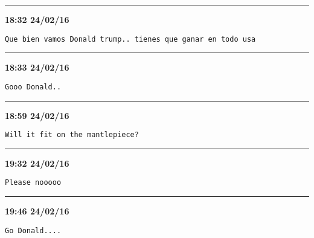 \hrule%

\begin{adjustwidth}{0cm}{0cm}
\footnotesize \textbf{18:32 24/02/16}

\begin{lstlisting}[breaklines, breakatwhitespace, basicstyle=\small, frame=leftline]
Que bien vamos Donald trump.. tienes que ganar en todo usa
\end{lstlisting}
\end{adjustwidth}

\hrule%

\begin{adjustwidth}{0cm}{0cm}
\footnotesize \textbf{18:33 24/02/16}

\begin{lstlisting}[breaklines, breakatwhitespace, basicstyle=\small, frame=leftline]
Gooo Donald..
\end{lstlisting}
\end{adjustwidth}

\hrule%

\begin{adjustwidth}{0cm}{0cm}
\footnotesize \textbf{18:59 24/02/16}

\begin{lstlisting}[breaklines, breakatwhitespace, basicstyle=\small, frame=leftline]
Will it fit on the mantlepiece?
\end{lstlisting}
\end{adjustwidth}

\hrule%

\begin{adjustwidth}{0cm}{0cm}
\footnotesize \textbf{19:32 24/02/16}

\begin{lstlisting}[breaklines, breakatwhitespace, basicstyle=\small, frame=leftline]
Please nooooo
\end{lstlisting}
\end{adjustwidth}

\hrule%

\begin{adjustwidth}{0cm}{0cm}
\footnotesize \textbf{19:46 24/02/16}

\begin{lstlisting}[breaklines, breakatwhitespace, basicstyle=\small, frame=leftline]
Go Donald....
\end{lstlisting}
\end{adjustwidth}


